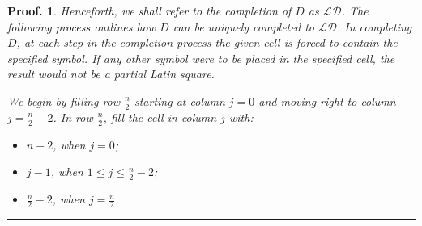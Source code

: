 \documentclass[12pt]{report}
\newtheorem{preproof}{{\bf Proof.}}
\newenvironment{proof}[1]{\begin{preproof}{\rm
               #1}\hfill{\rule[-0.5mm]{2mm}{2mm}}}{\end{preproof}}
\begin{document}
\begin{proof}{
Henceforth, we shall refer to the completion of $D$ as $\mathcal{LD}$.
The following process outlines how $D$ can be uniquely completed to $\mathcal{LD}$.
In completing $D$, at each step in the completion process
the given cell is forced to contain the specified symbol.  If any other
symbol were to be placed in the specified cell, the result
would not be a partial Latin square.

\vskip 2mm
\noindent We begin by filling row $\displaystyle{\frac{n}{2}}$ starting at column $j=0$ and moving right to column $j=\displaystyle{\frac{n}{2}} - 2$.
In row $\displaystyle{\frac{n}{2}}$, fill the cell in column $j$ with:
\begin{itemize}
\item[{}] $n - 2$, when $j=0$;
\item[{}] $j - 1$, when $1 \leq j \leq \displaystyle{\frac{n}{2}} - 2$;
\item[{}] $\displaystyle{\frac{n}{2}} - 2$, when $j = \displaystyle{\frac{n}{2}}$.
\end{itemize}

}
\end{proof}
\end{document}
